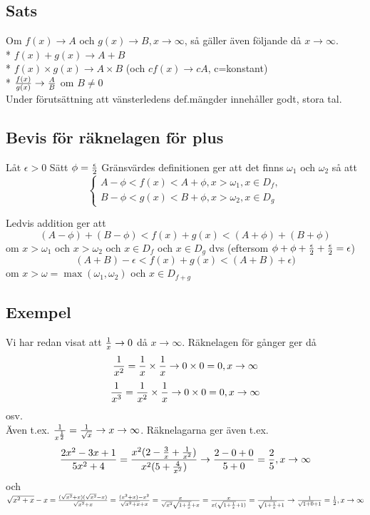\documentclass{article}
\begin{document}
\subsection{Sats}
Om $f(x)\to A$ och $g(x)\to B, x\to\infty$, så gäller även följande då $x\to\infty$.\\
* $f(x)+g(x)\to A+B$\\
* $f(x)\times g(x)\to A\times B$ (och $cf(x) \to cA$, c=konstant)\\
* $\frac{f(x)}{g(x)}\to \frac{A}{B}$ om $B\neq0$\\
Under förutsättning att vänsterledens def.mängder innehåller godt, stora tal.

\subsection{Bevis för räknelagen för plus}
Låt $\epsilon>0$ Sätt $\phi=\frac{\epsilon}{2}$ Gränsvärdes definitionen ger att det finns $\omega_1$ och $\omega_2$ så att
$$
\begin{cases}
  A-\phi < f(x) < A+\phi, x>\omega_1, x\in D_f,\\
  B-\phi < g(x) < B+\phi, x>\omega_2,  x\in D_g
\end{cases}
$$

Ledvis addition ger att
$$ (A-\phi)+(B-\phi) < f(x) + g(x) < (A+\phi)+(B+\phi) $$ om $x>\omega_1$ och $x>\omega_2$ och $x\in D_f$ och $x\in D_g$
dvs (eftersom $\phi+\phi + \frac{\epsilon}{2} + \frac{\epsilon}{2} = \epsilon$)
$$ (A+B)-\epsilon< f(x) + g(x) < (A+B)+\epsilon) $$ om $x>\omega = \max(\omega_1, \omega_2)$ och $x\in D_{f+g}$

\subsection{Exempel}
Vi har redan visat att $\frac{1}{x} \to 0$ då $x\to\infty$.
Räknelagen för gånger ger då
$$ \frac{1}{x^2}=\frac{1}{x} \times \frac{1}{x} \to 0\times 0 = 0, x\to\infty $$
$$ \frac{1}{x^3}=\frac{1}{x^2} \times \frac{1}{x} \to 0\times 0 = 0, x\to\infty $$
osv.\\

Även t.ex. $\frac{1}{x^{\frac{1}{2}}} = \frac{1}{\sqrt x} \to x\to \infty$.
Räknelagarna ger även t.ex.
$$ \frac{2x^2-3x+1}{5x^2+4} = \frac{x^2(2-\frac{3}{x} + \frac{1}{x^2})}{x^2(5+\frac{4}{x^2})} \to \frac{2-0+0}{5+0} = \frac{2}{5}, x\to\infty $$
och\\

$ \sqrt{x^2+x} - x = \frac{(\sqrt{x^2} + x)(\sqrt{x^2} - x)}{\sqrt{x^2} + x} = \frac{(x^2 + x) - x^2}{\sqrt{x^2+x} + x} = \frac{x}{ \sqrt{x^2} \sqrt{1+\frac{1}{x}} + x } = \frac{x}{x(\sqrt{1+\frac{1}{x}} + 1)} =
\frac{1}{\sqrt{1+\frac{1}{x}} + 1} \to \frac{1}{\sqrt{1+0} + 1} = \frac{1}{2}, x\to\infty $\\
\end{document}
